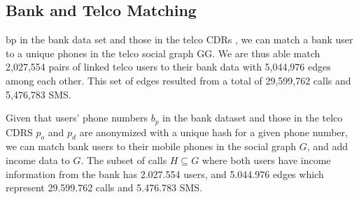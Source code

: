 \subsection{Bank and Telco Matching}

 bp in the bank data set and those in the telco CDRs , we can match a bank user to a unique phones in the telco social graph GG. We are thus able match 2,027,554 pairs of linked telco users to their bank data with 5,044,976 edges among each other. This set of edges resulted from a total of 29,599,762 calls and 5,476,783 SMS.

Given that users' phone numbers \( b_p \) in the bank dataset and those in the telco CDRS \( p_o \) and \( p_d \) are anonymized with a unique hash for a given phone number, we can match bank users to their mobile phones in the social graph $ G $, and add income data to \( G \). The subset of calls \( H \subseteq G \) where both users have income information from the bank has \num{2,027,554} users, and \num{5,044,976} edges which represent \num{29,599,762} calls and \num{5,476,783} SMS.

